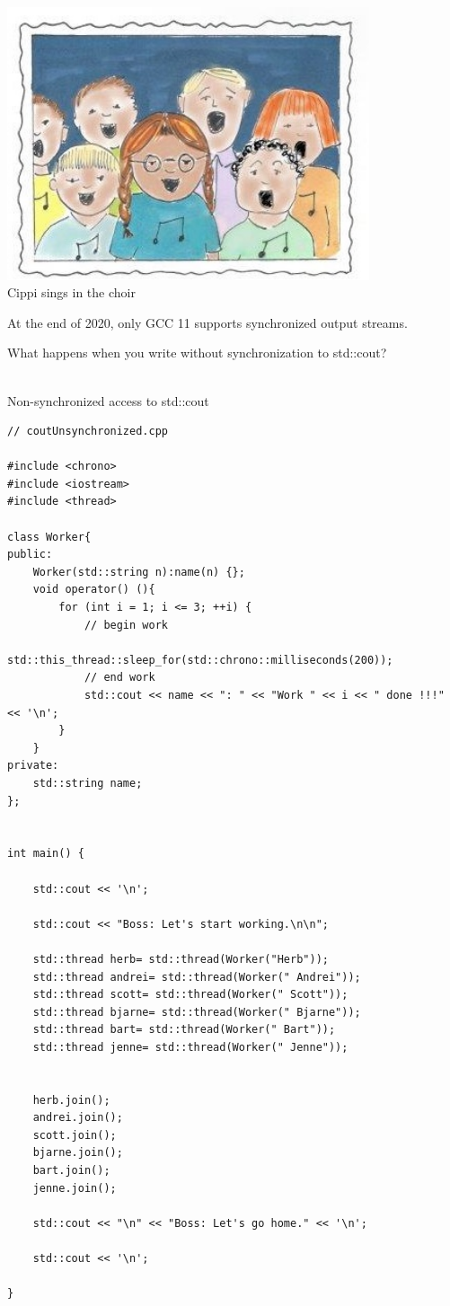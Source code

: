 \begin{center}
\includegraphics[width=0.8\textwidth]{content/3/chapter6/images/28.png}\\
Cippi sings in the choir
\end{center}


\begin{tcolorbox}[breakable,enhanced jigsaw,colback=blue!5!white,colframe=blue!75!black,title={Compiler Support for Synchronized Output Streams}]
	
At the end of 2020, only GCC 11 supports synchronized output streams.
	
\end{tcolorbox}

What happens when you write without synchronization to std::cout?

\hspace*{\fill} \\ %
\noindent
Non-synchronized access to std::cout
\begin{lstlisting}[style=styleCXX]
// coutUnsynchronized.cpp

#include <chrono>
#include <iostream>
#include <thread>

class Worker{
public:
	Worker(std::string n):name(n) {};
	void operator() (){
		for (int i = 1; i <= 3; ++i) {
			// begin work
			std::this_thread::sleep_for(std::chrono::milliseconds(200));
			// end work
			std::cout << name << ": " << "Work " << i << " done !!!" << '\n';
		}
	}
private:
	std::string name;
};


int main() {

	std::cout << '\n';
	
	std::cout << "Boss: Let's start working.\n\n";
	
	std::thread herb= std::thread(Worker("Herb"));
	std::thread andrei= std::thread(Worker(" Andrei"));
	std::thread scott= std::thread(Worker(" Scott"));
	std::thread bjarne= std::thread(Worker(" Bjarne"));
	std::thread bart= std::thread(Worker(" Bart"));
	std::thread jenne= std::thread(Worker(" Jenne"));
	
	
	herb.join();
	andrei.join();
	scott.join();
	bjarne.join();
	bart.join();
	jenne.join();
	
	std::cout << "\n" << "Boss: Let's go home." << '\n';
	
	std::cout << '\n';

}
\end{lstlisting}

